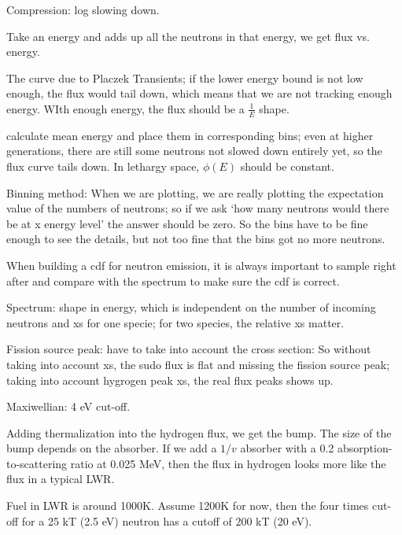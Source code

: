 \documentclass{school-22.211-notes}
\begin{document}
Compression: log slowing down. 

Take an energy and adds up all the neutrons in that energy, we get flux vs. energy. 

The curve due to Placzek Transients; if the lower energy bound is not low enough, the flux would tail down, which means that we are not tracking enough energy. WIth enough energy, the flux should be a $\frac{1}{E}$ shape. 

 calculate mean energy and place them in corresponding bins; even at higher generations, there are still some neutrons not slowed down entirely yet, so the flux curve tails down. In lethargy space, $\phi(E)$ should be constant. 

Binning method: When we are plotting, we are really plotting the expectation value of the numbers of neutrons; so if we ask `how many neutrons would there be at x energy level' the answer should be zero. So the bins have to be fine enough to see the details, but not too fine that the bins got no more neutrons. 


When building a cdf for neutron emission, it is always important to sample right after and compare with the spectrum to make sure the cdf is correct. 

Spectrum: shape in energy, which is independent on the number of incoming neutrons and xs for one specie; for two species, the relative xs matter. 

Fission source peak: have to take into account the cross section: 
So without taking into account xs, the sudo flux is flat and missing the fission source peak; taking into account hygrogen peak xs, the real flux peaks shows up. 


Maxiwellian: 4 eV cut-off. 


Adding thermalization into the hydrogen flux, we get the bump. The size of the bump depends on the absorber. If we add a $1/v$ absorber with a 0.2 absorption-to-scattering ratio at 0.025 MeV, then the flux in hydrogen looks more like the flux in a typical LWR. 


Fuel in LWR is around 1000K. Assume 1200K for now, then the four times cut-off for a 25 kT (2.5 eV) neutron has a cutoff of 200 kT (20 eV). 
\end{document}
